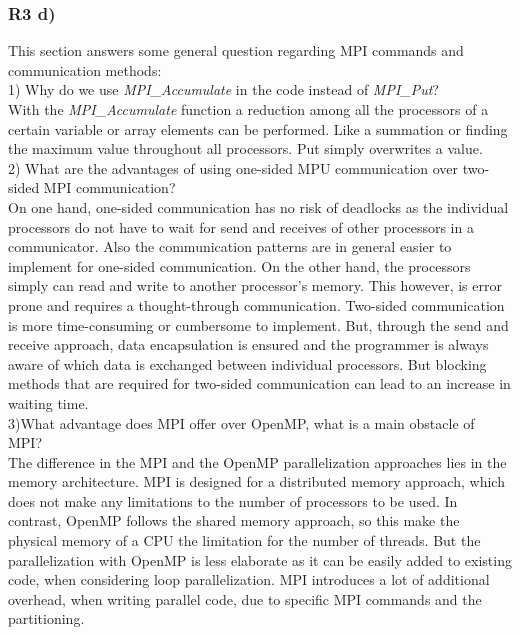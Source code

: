 \subsubsection{R3 d)}

This section answers some general question regarding MPI commands and communication methods:\\

1) Why do we use \textit{MPI\_Accumulate} in the code instead of \textit{MPI\_Put}?\\

With the \textit{MPI\_Accumulate} function a reduction among all the processors of a certain variable or array elements can be performed. Like a summation or finding the maximum value throughout all processors. Put simply overwrites a value.\\

2) What are the advantages of using one-sided MPU communication over two-sided MPI communication?\\

On one hand, one-sided communication has no risk of deadlocks as the individual processors do not have to wait for send and receives of other processors in a communicator. Also the communication patterns are in general easier to implement for one-sided communication. On the other hand, the processors simply can read and write to another processor's memory. This however, is error prone and requires a thought-through communication. 
Two-sided communication is more time-consuming or cumbersome to implement. But, through the send and receive approach, data encapsulation is ensured and the programmer is always aware of which data is exchanged between individual processors. But blocking methods that are required for two-sided communication can lead to an increase in waiting time.\\

3)What advantage does MPI offer over OpenMP, what is a main obstacle of MPI?\\

The difference in the MPI and the OpenMP parallelization approaches lies in the memory architecture. MPI is designed for a distributed memory approach, which does not make any limitations to the number of processors to be used. In contrast, OpenMP follows the shared memory approach, so this make the physical memory of a CPU the limitation for the number of threads. But the parallelization with OpenMP is less elaborate as it can be easily added to existing code, when considering loop parallelization. MPI introduces a lot of additional overhead, when writing parallel code, due to specific MPI commands and the partitioning.

